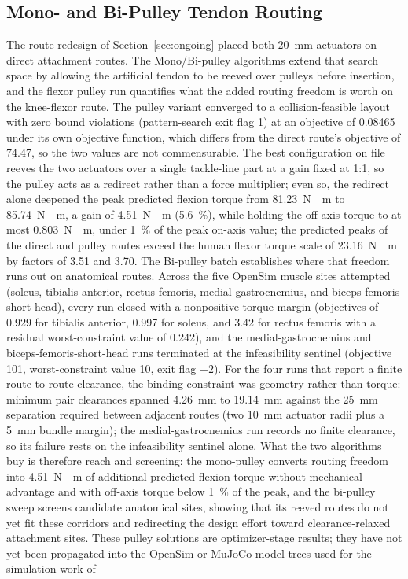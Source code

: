 \subsection{Mono- and Bi-Pulley Tendon Routing}\label{sec:disc_pulley}

The route redesign of Section~\ref{sec:ongoing} placed both \qty{20}{\mm} actuators on direct attachment routes. The Mono/Bi-pulley algorithms extend that search space by allowing the artificial tendon to be reeved over pulleys before insertion, and the flexor pulley run quantifies what the added routing freedom is worth on the knee-flexor route. The pulley variant converged to a collision-feasible layout with zero bound violations (pattern-search exit flag 1) at an objective of 0.08465 under its own objective function, which differs from the direct route's objective of 74.47, so the two values are not commensurable. The best configuration on file reeves the two actuators over a single tackle-line part at a gain fixed at 1:1, so the pulley acts as a redirect rather than a force multiplier; even so, the redirect alone deepened the peak predicted flexion torque from \qty{81.23}{\newton\cdot\meter} to \qty{85.74}{\newton\cdot\meter}, a gain of \qty{4.51}{\newton\cdot\meter} (\qty{5.6}{\percent}), while holding the off-axis torque to at most \qty{0.803}{\newton\cdot\meter}, under \qty{1}{\percent} of the peak on-axis value; the predicted peaks of the direct and pulley routes exceed the human flexor torque scale of \qty{23.16}{\newton\cdot\meter} by factors of 3.51 and 3.70. The Bi-pulley batch establishes where that freedom runs out on anatomical routes. Across the five OpenSim muscle sites attempted (soleus, tibialis anterior, rectus femoris, medial gastrocnemius, and biceps femoris short head), every run closed with a nonpositive torque margin (objectives of 0.929 for tibialis anterior, 0.997 for soleus, and 3.42 for rectus femoris with a residual worst-constraint value of 0.242), and the medial-gastrocnemius and biceps-femoris-short-head runs terminated at the infeasibility sentinel (objective 101, worst-constraint value 10, exit flag $-2$). For the four runs that report a finite route-to-route clearance, the binding constraint was geometry rather than torque: minimum pair clearances spanned \qty{4.26}{\mm} to \qty{19.14}{\mm} against the \qty{25}{\mm} separation required between adjacent routes (two \qty{10}{\mm} actuator radii plus a \qty{5}{\mm} bundle margin); the medial-gastrocnemius run records no finite clearance, so its failure rests on the infeasibility sentinel alone. What the two algorithms buy is therefore reach and screening: the mono-pulley converts routing freedom into \qty{4.51}{\newton\cdot\meter} of additional predicted flexion torque without mechanical advantage and with off-axis torque below \qty{1}{\percent} of the peak, and the bi-pulley sweep screens candidate anatomical sites, showing that its reeved routes do not yet fit these corridors and redirecting the design effort toward clearance-relaxed attachment sites. These pulley solutions are optimizer-stage results; they have not yet been propagated into the OpenSim or MuJoCo model trees used for the simulation work of 